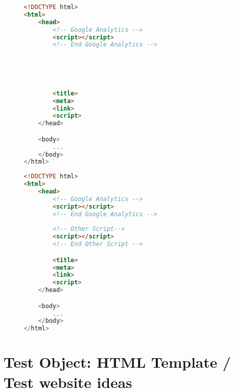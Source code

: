 


\begin{sidewaysfigure}

\begin{multicols}{2}

\begin{center}
\begin{lstlisting}[caption={Other Script 1}, language=html, numbers=none]
<!DOCTYPE html>
<html>
    <head>
        <!-- Google Analytics -->
        <script></script>
        <!-- End Google Analytics -->
        




        <title>
        <meta>
        <link>
        <script>
    </head>

    <body>
        ...
    </body>
</html>
\end{lstlisting}
\end{center}

\columnbreak

\begin{center}
\begin{lstlisting}[caption={Other Script 2}, language=html, numbers=none]
<!DOCTYPE html>
<html>
    <head>
        <!-- Google Analytics -->
        <script></script>
        <!-- End Google Analytics -->
        
        <!-- Other Script-->
        <script></script>
        <!-- End Other Script -->

        <title>
        <meta>
        <link>
        <script>
    </head>

    <body>
        ...
    </body>
</html>
\end{lstlisting}
\end{center}


\end{multicols}

\end{sidewaysfigure}











\section{Test Object: HTML Template / Test website ideas}


